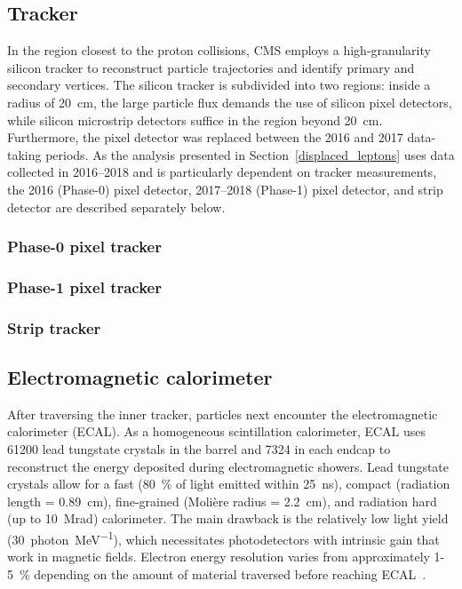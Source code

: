 \subsection{Tracker}
\label{tracker}
In the region closest to the proton collisions, CMS employs a high-granularity silicon tracker to reconstruct particle trajectories and identify primary and secondary vertices. The silicon tracker is subdivided into two regions: inside a radius of \SI{20}{\cm}, the large particle flux demands the use of silicon pixel detectors, while silicon microstrip detectors suffice in the region beyond \SI{20}{\cm}. Furthermore, the pixel detector was replaced between the 2016 and 2017 data-taking periods. As the analysis presented in Section~\ref{displaced_leptons} uses data collected in 2016--2018 and is particularly dependent on tracker measurements, the 2016 (Phase-0) pixel detector, 2017--2018 (Phase-1) pixel detector, and strip detector are described separately below.

\subsubsection{Phase-0 pixel tracker}
\cite{cms_tdr_v1}

\subsubsection{Phase-1 pixel tracker}
\cite{cms_phase1_pixels}

\subsubsection{Strip tracker}
\cite{cms_tdr_v1}

\subsection{Electromagnetic calorimeter}
After traversing the inner tracker, particles next encounter the electromagnetic calorimeter (ECAL). As a homogeneous scintillation calorimeter, ECAL uses \num{61200} lead tungstate crystals in the barrel and \num{7324} in each endcap to reconstruct the energy deposited during electromagnetic showers. Lead tungstate crystals allow for a fast (\SI{80}{\percent} of light emitted within \SI{25}{\nano\s}), compact (radiation length = \SI{0.89}{cm}), fine-grained (Moli\`ere radius = \SI{2.2}{cm}), and radiation hard (up to \SI{10}{\mega rad}) calorimeter. The main drawback is the relatively low light yield (\SI{30}{photon\per\mega\electronvolt}), which necessitates photodetectors with intrinsic gain that work in magnetic fields\cite{cms_experiment, cms_tdr_v1}. Electron energy resolution varies from approximately \num{1}-\SI{5}{\percent} depending on the amount of material traversed before reaching ECAL~\cite{cms_ecal_performance}.

